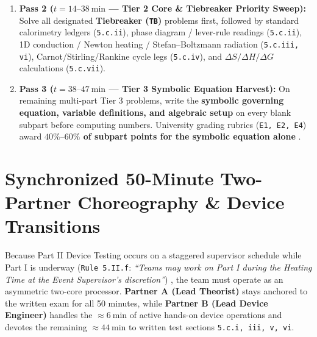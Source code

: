 \begin{itemize}
\begin{enumerate}
    \item \textbf{Pass 2 ($t = 14\text{--}\SI{38}{\minute}$ --- Tier 2 Core \& Tiebreaker Priority Sweep):} Solve all designated \textbf{Tiebreaker (\texttt{TB})} problems first, followed by standard calorimetry ledgers (\texttt{5.c.ii}), phase diagram / lever-rule readings (\texttt{5.c.ii}), 1D conduction / Newton heating / Stefan--Boltzmann radiation (\texttt{5.c.iii, vi}), Carnot/Stirling/Rankine cycle legs (\texttt{5.c.iv}), and $\Delta S / \Delta H / \Delta G$ calculations (\texttt{5.c.vii}).
    \item \textbf{Pass 3 ($t = 38\text{--}\SI{47}{\minute}$ --- Tier 3 Symbolic Equation Harvest):} On remaining multi-part Tier 3 problems, write the \textbf{symbolic governing equation, variable definitions, and algebraic setup} on every blank subpart before computing numbers. University grading rubrics (\texttt{E1, E2, E4}) award \textbf{$40\%\text{--}60\%$ of subpart points for the symbolic equation alone} .
  \end{enumerate}
\end{itemize}

\section{Synchronized 50-Minute Two-Partner Choreography \& Device Transitions}\label{sec:21.2}


Because Part II Device Testing occurs on a staggered supervisor schedule while Part I is underway (\texttt{Rule 5.II.f}: \textit{``Teams may work on Part I during the Heating Time at the Event Supervisor's discretion''}) , the team must operate as an asymmetric two-core processor. \textbf{Partner A (Lead Theorist)} stays anchored to the written exam for all 50 minutes, while \textbf{Partner B (Lead Device Engineer)} handles the $\approx \SI{6}{\minute}$ of active hands-on device operations and devotes the remaining \textbf{$\approx \SI{44}{\minute}$} to written test sections \texttt{5.c.i, iii, v, vi}.

